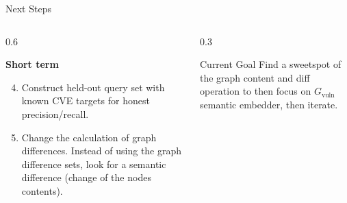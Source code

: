 \documentclass[aspectratio=169,10pt]{beamer}
\begin{document}
\begin{frame}{Next Steps}
\begin{columns}[T]
\begin{column}{0.6\textwidth}
   

  \vspace{0.8em}
  \textbf{Short term}
  \begin{enumerate}\setcounter{enumi}{3}
    \item Construct held-out query set with known
      CVE targets for honest precision/recall.
    
    \item Change the calculation of graph differences. 
      Instead of using the graph difference sets, look for a semantic difference (change of the nodes contents).
  \end{enumerate}
\end{column}
\begin{column}{0.3\textwidth}

  \vspace{0.5em}
  \begin{block}{Current Goal}
    Find a sweetspot of the graph content and diff operation to then focus on $G_{\text{vuln}}$
    semantic embedder, then iterate.
  \end{block}
\end{column}
\end{columns}
\end{frame}
\end{document}
